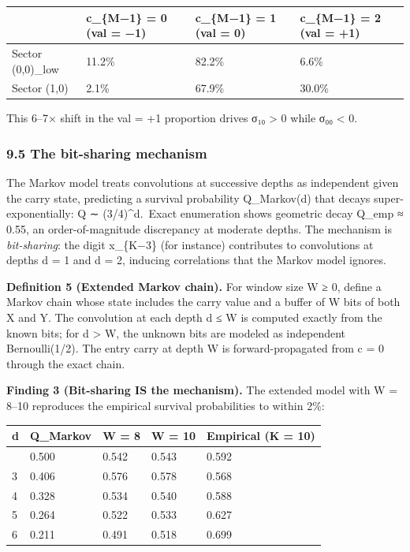 \documentclass[
  11pt,
]{article}
\begin{document}
\begin{longtable}[]{@{}llll@{}}
\toprule\noalign{}
& c\_\{M−1\} = 0 (val = −1) & c\_\{M−1\} = 1 (val = 0) & c\_\{M−1\} = 2 (val =
+1) \\
\midrule\noalign{}
\endhead
\bottomrule\noalign{}
\endlastfoot
Sector (0,0)\_low & 11.2\% & 82.2\% & 6.6\% \\
Sector (1,0) & 2.1\% & 67.9\% & 30.0\% \\
\end{longtable}

This 6--7× shift in the val = +1 proportion drives σ₁₀ \textgreater{} 0 while
σ₀₀ \textless{} 0.

\subsubsection{9.5 The bit-sharing mechanism}\label{the-bit-sharing-mechanism}

The Markov model treats convolutions at successive depths as independent given
the carry state, predicting a survival probability Q\_Markov(d) that decays
super-exponentially: Q ∼ (3/4)\^{}d.~Exact enumeration shows geometric decay
Q\_emp ≈ 0.55, an order-of-magnitude discrepancy at moderate depths. The
mechanism is \emph{bit-sharing}: the digit x\_\{K−3\} (for instance) contributes
to convolutions at depths d = 1 and d = 2, inducing correlations that the Markov
model ignores.

\textbf{Definition 5 (Extended Markov chain).} For window size W ≥ 0, define a
Markov chain whose state includes the carry value and a buffer of W bits of both
X and Y. The convolution at each depth d ≤ W is computed exactly from the known
bits; for d \textgreater{} W, the unknown bits are modeled as independent
Bernoulli(1/2). The entry carry at depth W is forward-propagated from c = 0
through the exact chain.

\textbf{Finding 3 (Bit-sharing IS the mechanism).} The extended model with W =
8--10 reproduces the empirical survival probabilities to within 2\%:

\begin{longtable}[]{@{}lllll@{}}
\toprule\noalign{}
d & Q\_Markov & W = 8 & W = 10 & Empirical (K = 10) \\
\midrule\noalign{}
\endhead
\bottomrule\noalign{}
\endlastfoot
2 & 0.500 & 0.542 & 0.543 & 0.592 \\
3 & 0.406 & 0.576 & 0.578 & 0.568 \\
4 & 0.328 & 0.534 & 0.540 & 0.588 \\
5 & 0.264 & 0.522 & 0.533 & 0.627 \\
6 & 0.211 & 0.491 & 0.518 & 0.699 \\
\end{longtable}
\end{document}
